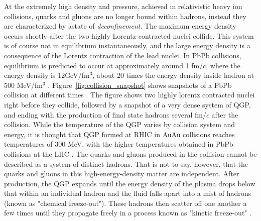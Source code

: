 At the extremely high density and pressure, achieved in relativistic heavy ion collisions, quarks and gluons are no longer bound within hadrons, instead they are characterized by astate of \textit{deconfinement}. The maximum energy density occurs shortly after the two highly Lorentz-contracted nuclei collide.  This system is of course not in equilibrium instantaneously, and the large energy density is a consequence of the Lorentz contraction of the lead nuclei. In PbPb collisions, equilibrium is predicted to occur at approximately around 1 fm/$c$, where the energy density is 12GeV/fm$^3$, about 20 times the energy density inside hadron at 500 MeV/fm$^3$ \cite{annurev-nucl}. Figure~\ref{fig:collision_snapshot} shows snapshots of a PbPb collision at different times \cite{annurev-nucl}. The figure shows two highly lorentz contracted nuclei right before they collide, followed by a snapshot of a very dense system of QGP, and ending with the production of final state hadrons several fm/$c$ after the collision. While the temperature of the QGP varies by collision system and energy, it is thought that QGP formed at RHIC in AuAu collisions reaches temperatures of 300 MeV, with the higher temperatures obtained in PbPb collisions at the LHC \cite{annurev-nucl}. The quarks and gluons produced in the collision cannot be described as a system of distinct hadrons. That is not to say, however, that the quarks and gluons in this high-energy-density matter are independent. After production, the QGP expands until the energy density of the plasma drops below that within an individual hadron and the fluid falls apart into a mist of hadrons (known as "chemical freeze-out"). These hadrons then scatter off one another a few times until they propagate freely in a process known as "kinetic freeze-out" \cite{annurev-nucl}.

